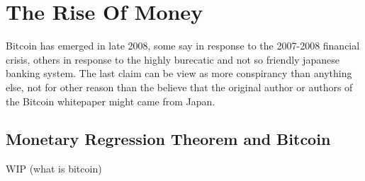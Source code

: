 \section{The Rise Of Money}
Bitcoin has emerged in late 2008, some say in response to the 2007-2008 financial crisis, others in response to the highly burecatic and not so friendly
japanese banking system.
The last claim can be view as more conspirancy than anything else, not for other reason than the believe that the original author or authors of the Bitcoin
whitepaper \cite{nakamoto2008bitcoin} might came from Japan.

\subsection{Monetary Regression Theorem and Bitcoin}
WIP (what is bitcoin)